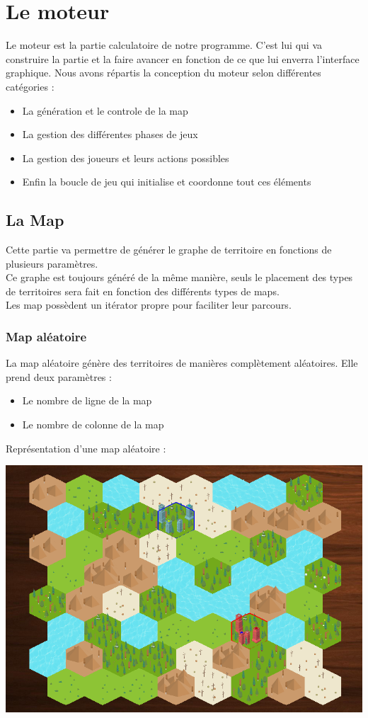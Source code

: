   
  \section{Le moteur}
    Le moteur est la partie calculatoire de notre programme. C'est lui qui va construire la partie et la faire avancer en fonction de ce que lui enverra l'interface graphique.
    Nous avons répartis la conception du moteur selon différentes catégories :
    \begin{itemize}
      \item La génération et le controle de la map
      \item La gestion des différentes phases de jeux
      \item La gestion des joueurs et leurs actions possibles
      \item Enfin la boucle de jeu qui initialise et coordonne tout ces éléments
    \end{itemize}

  
    \subsection{La Map}
      Cette partie va permettre de générer le graphe de territoire en fonctions de plusieurs paramètres. \\
      Ce graphe est toujours généré de la même manière, seuls le placement des types de territoires sera fait en fonction des différents types de maps. \\
      Les map possèdent un itérator propre pour faciliter leur parcours. \\
      
      \subsubsection{Map aléatoire}
	La map aléatoire génère des territoires de manières complètement aléatoires. Elle prend deux paramètres :
	\begin{itemize}
	  \item Le nombre de ligne de la map
	  \item Le nombre de colonne de la map
	\end{itemize}
	\vspace{0.5cm}
	Représentation d'une map aléatoire : 
	
	\includegraphics[scale=0.7]{map/random.PNG}

